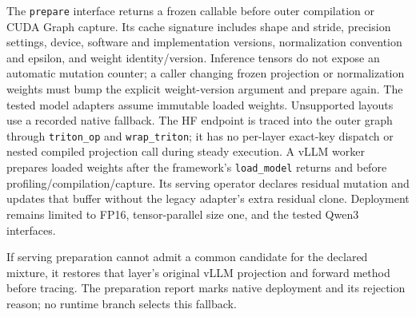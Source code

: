 The \texttt{prepare} interface returns a frozen callable before outer compilation or CUDA Graph capture. Its cache signature includes shape and stride, precision settings, device, software and implementation versions, normalization convention and epsilon, and weight identity/version. Inference tensors do not expose an automatic mutation counter; a caller changing frozen projection or normalization weights must bump the explicit weight-version argument and prepare again. The tested model adapters assume immutable loaded weights. Unsupported layouts use a recorded native fallback. The HF endpoint is traced into the outer graph through \texttt{triton\_op} and \texttt{wrap\_triton}; it has no per-layer exact-key dispatch or nested compiled projection call during steady execution. A vLLM worker prepares loaded weights after the framework's \texttt{load\_model} returns and before profiling/compilation/capture. Its serving operator declares residual mutation and updates that buffer without the legacy adapter's extra residual clone. Deployment remains limited to FP16, tensor-parallel size one, and the tested Qwen3 interfaces.

If serving preparation cannot admit a common candidate for the declared mixture, it restores that layer's original vLLM projection and forward method before tracing. The preparation report marks native deployment and its rejection reason; no runtime branch selects this fallback.
